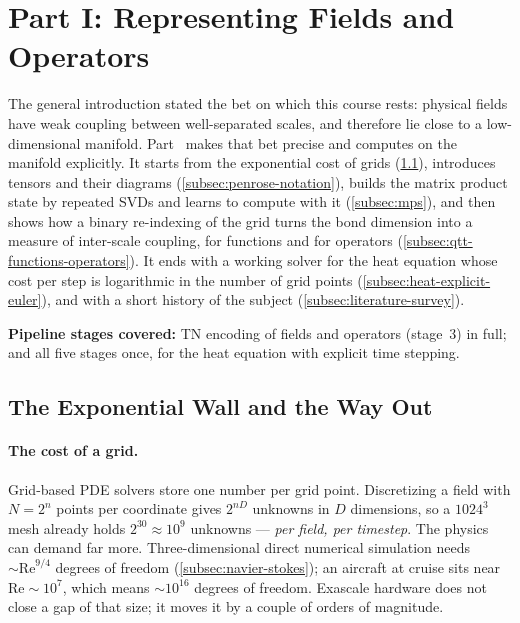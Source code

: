 \section{Part I: Representing Fields and Operators}
\label{sec:part1}


The general introduction stated the bet on which this course rests: physical
fields have weak coupling between well-separated scales, and therefore lie close
to a low-dimensional manifold. Part~ makes that bet precise and
computes on the manifold explicitly. It starts from the exponential cost of
grids (\cref{subsec:numerical-methods-intro}), introduces tensors and their
diagrams (\cref{subsec:penrose-notation}), builds the matrix product state by
repeated SVDs and learns to compute with it (\cref{subsec:mps}), and then shows
how a binary re-indexing of the grid turns the bond dimension into a measure of
inter-scale coupling, for functions and for operators
(\cref{subsec:qtt-functions-operators}). It ends with a working solver for the
heat equation whose cost per step is logarithmic in the number of grid points
(\cref{subsec:heat-explicit-euler}), and with a short history of the subject
(\cref{subsec:literature-survey}).

\textbf{Pipeline stages covered:} TN encoding of fields and operators (stage~3)
in full; and all five stages once, for the heat equation with explicit time
stepping.

\subsection{The Exponential Wall and the Way Out}
\label{subsec:numerical-methods-intro}

\paragraph{The cost of a grid.}
Grid-based PDE solvers store one number per grid point. Discretizing a field
with $N = 2^n$ points per coordinate gives $2^{nD}$ unknowns in $D$ dimensions,
so a $1024^3$ mesh already holds $2^{30} \approx 10^9$ unknowns --- \emph{per
field, per timestep}. The physics can demand far more. Three-dimensional direct
numerical simulation needs $\sim\!\mathrm{Re}^{9/4}$ degrees of freedom
(\cref{subsec:navier-stokes}); an aircraft at cruise sits near
$\mathrm{Re} \sim 10^{7}$, which means $\sim\!10^{16}$ degrees of freedom.
Exascale hardware does not close a gap of that size; it moves it by a couple of
orders of magnitude.

